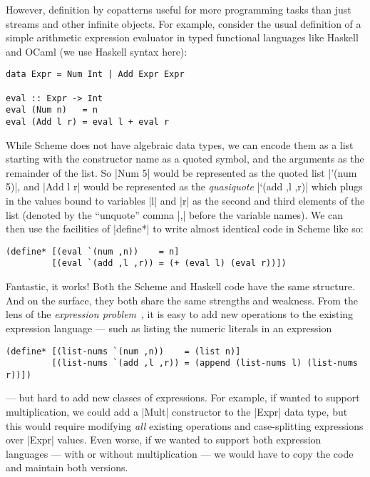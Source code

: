 However, definition by copatterns useful for more programming tasks than just streams and other infinite objects.
For example, consider the usual definition of a simple arithmetic expression evaluator in typed functional languages like Haskell and OCaml (we use Haskell syntax here):
\begin{verbatim}
data Expr = Num Int | Add Expr Expr

eval :: Expr -> Int
eval (Num n)   = n
eval (Add l r) = eval l + eval r
\end{verbatim}
While Scheme does not have algebraic data types, we can encode them as a list starting with the constructor name as a quoted symbol, and the arguments as the remainder of the list.
So \hs|Num 5| would be represented as the quoted list \scm|'(num 5)|, and \scm|Add l r| would be represented as the \emph{quasiquote} \scm|`(add ,l ,r)| which plugs in the values bound to variables \scm|l| and \scm|r| as the second and third elements of the list (denoted by the ``unquote'' comma \scm|,| before the variable names).
We can then use the facilities of \scm|define*| to write almost identical code in Scheme like so:
\begin{verbatim}
(define* [(eval `(num ,n))    = n]
         [(eval `(add ,l ,r)) = (+ (eval l) (eval r))])
\end{verbatim}
Fantastic, it works!
Both the Scheme and Haskell code have the same structure.
And on the surface, they both share the same strengths and weakness.
From the lens of the \emph{expression problem}~\cite{ExpressionProblem}, it is easy to add new operations to the existing expression language --- such as listing the numeric literals in an expression
\begin{verbatim}
(define* [(list-nums `(num ,n))    = (list n)]
         [(list-nums `(add ,l ,r)) = (append (list-nums l) (list-nums r))])
\end{verbatim}
--- but hard to add new classes of expressions.
For example, if wanted to support multiplication, we could add a \hs|Mult| constructor to the \hs|Expr| data type, but this would require modifying \emph{all} existing operations and case-splitting expressions over \hs|Expr| values.
Even worse, if we wanted to support both expression languages --- with or without multiplication --- we would have to copy the code and maintain both versions.

